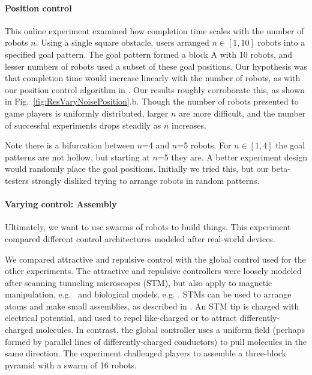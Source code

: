 \paragraph{Position control}
This online experiment examined how completion time scales with the number of robots $n$. Using a single square obstacle, users arranged $n\in[1,10]$ robots into a specified goal pattern.  The goal pattern formed a block  {\sffamily A} with 10 robots, and lesser numbers of robots used a subset of these goal positions. Our hypothesis was that completion time would increase linearly with the number of robots, as with our position control algorithm in \cite{Becker2013b}.  Our results roughly corroborate this, as shown in Fig.~\ref{fig:ResVaryNoisePosition}.b.  Though the number of robots presented to game players is uniformly distributed, larger $n$ are more difficult, and the number of successful experiments drops steadily as $n$ increases.



Note there is a bifurcation between $n$=4 and $n$=5 robots. For $n\in[1,4]$ the goal patterns are not hollow, but starting at $n$=5 they are.  A better experiment design would randomly place the goal positions.  Initially we tried this, but our beta-testers strongly disliked trying to arrange robots in random patterns.


\paragraph{Varying control: Assembly}
Ultimately, we want to use swarms of robots to build things. This experiment compared different control architectures modeled after real-world devices.

We compared attractive and repulsive control with the global control used for the other experiments. The attractive and repulsive controllers were loosely modeled after scanning tunneling microscopes (STM), but also apply to magnetic manipulation, e.g.\ \cite{Khalil2013} and biological models, e.g. \cite{goodrich2012types}. STMs can be used to arrange atoms and make small assemblies, as described in \cite{avouris1995manipulation}. An STM tip is charged with electrical potential, and used to repel like-charged or to attract differently-charged molecules. In contrast, the global controller uses a uniform field (perhaps formed by parallel lines of differently-charged conductors) to pull molecules in the same direction.
The experiment challenged players to assemble a three-block pyramid with a swarm of 16 robots.


